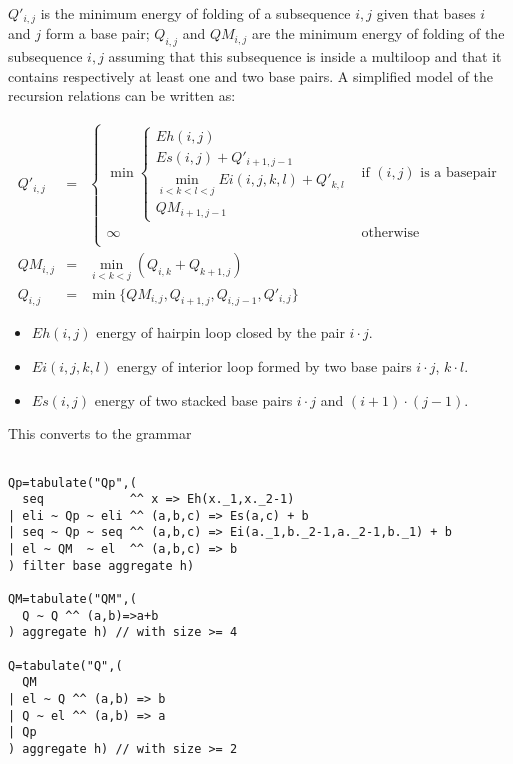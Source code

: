 \documentclass[11pt]{article}
\begin{document}
$Q'_{i,j}$ is the minimum energy of folding of a subsequence $i,j$ given that bases $i$ and $j$ form a base pair; $Q_{i,j}$ and $QM_{i,j}$ are the minimum energy of folding of the subsequence $i,j$ assuming that this subsequence is inside a multiloop and that it contains respectively at least one and two base pairs. A simplified model of the recursion relations can be written as:

\[\begin{array}{rcl}
Q'_{i,j}&=&\left\{\begin{array}{ll}
	\min\left\{\begin{array}{l}
	Eh(i,j) \\
	Es(i,j)+Q'_{i+1,j-1} \\
	\min\limits_{i<k<l<j}Ei(i,j,k,l)+Q'_{k,l} \\
	QM_{i+1,j-1}
	\end{array}\right. & \text{if } (i,j) \text{ is a basepair}\\
	\infty & \text{otherwise} \\
	\end{array}\right. \\
QM_{i,j} &=& \min\limits_{i<k<j}(Q_{i,k}+Q_{k+1,j})\\
Q_{i,j} &=& \min\{ QM_{i,j}, Q_{i+1,j},Q_{i,j-1},Q'_{i,j} \}
\end{array}\]
\begin{itemize}
\item $Eh(i,j)$ energy of hairpin loop closed by the pair $i \cdot j$.
\item $Ei(i,j,k,l)$ energy of interior loop formed by two base pairs $i \cdot j$, $k \cdot l$.
\item $Es(i,j)$ energy of two stacked base pairs $i\cdot j$ and $(i+1)\cdot(j-1)$.
\end{itemize}

This converts to the grammar
\begin{verbatim}

Qp=tabulate("Qp",(
  seq            ^^ x => Eh(x._1,x._2-1)
| eli ~ Qp ~ eli ^^ (a,b,c) => Es(a,c) + b
| seq ~ Qp ~ seq ^^ (a,b,c) => Ei(a._1,b._2-1,a._2-1,b._1) + b
| el ~ QM  ~ el  ^^ (a,b,c) => b
) filter base aggregate h)

QM=tabulate("QM",(
  Q ~ Q ^^ (a,b)=>a+b
) aggregate h) // with size >= 4

Q=tabulate("Q",(
  QM
| el ~ Q ^^ (a,b) => b
| Q ~ el ^^ (a,b) => a
| Qp
) aggregate h) // with size >= 2

\end{verbatim}
\end{document}
